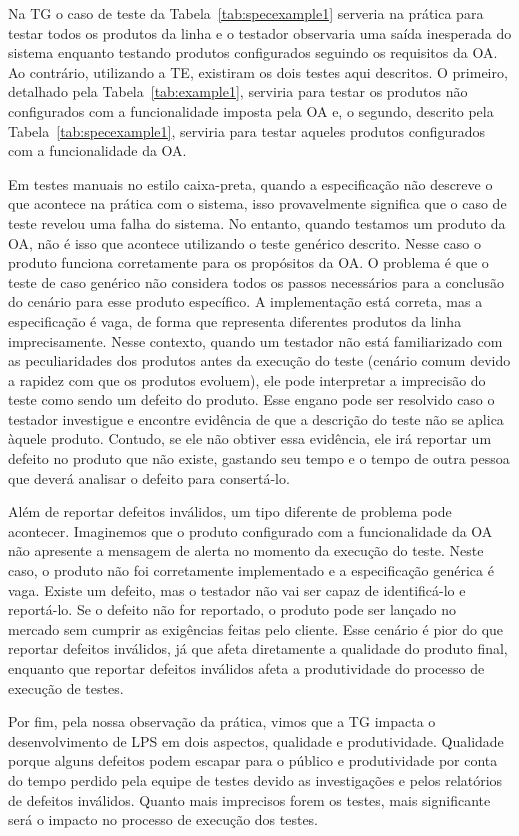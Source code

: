 Na TG o caso de teste da Tabela~\ref{tab:specexample1} serveria na prática para
testar todos os produtos da linha e o testador observaria uma saída inesperada
do sistema enquanto testando produtos configurados seguindo os requisitos da OA.
Ao contrário, utilizando a TE, existiram os dois testes aqui descritos. O
primeiro, detalhado pela Tabela~\ref{tab:example1}, serviria para testar os
produtos não configurados com a funcionalidade imposta pela OA e, o segundo,
descrito pela Tabela~\ref{tab:specexample1}, serviria para testar aqueles
produtos configurados com a funcionalidade da OA.

Em testes manuais no estilo caixa-preta, quando a especificação não descreve o
que acontece na prática com o sistema, isso provavelmente significa que o caso
de teste revelou uma falha do sistema. No entanto, quando testamos um produto da
OA, não é isso que acontece utilizando o teste genérico descrito. Nesse caso o
produto funciona corretamente para os propósitos da OA. O problema é que o teste
de caso genérico não considera todos os passos necessários para a conclusão do
cenário para esse produto específico. A implementação está correta, mas a
especificação é vaga, de forma que representa diferentes
produtos da linha imprecisamente. Nesse contexto, quando um testador não está familiarizado com
as peculiaridades dos produtos antes da execução do teste (cenário comum
devido a rapidez com que os produtos evoluem), ele pode interpretar a imprecisão
do teste como sendo um defeito do produto. Esse engano pode ser resolvido caso o
testador investigue e encontre evidência de que a descrição do teste não se aplica
àquele produto. Contudo, se ele não obtiver essa evidência, ele irá reportar um
defeito no produto que não existe, gastando seu tempo e o tempo de outra pessoa
que deverá analisar o defeito para consertá-lo.

Além de reportar defeitos inválidos, um tipo diferente de problema pode
acontecer. Imaginemos que o produto configurado com a funcionalidade da OA não
apresente a mensagem de alerta no momento da execução do teste. Neste caso, o
produto não foi corretamente implementado e a especificação genérica é vaga.
Existe um defeito, mas o testador não vai ser capaz de identificá-lo e
reportá-lo. Se o defeito não for reportado, o produto pode ser lançado no
mercado sem cumprir as exigências feitas pelo cliente. Esse cenário é pior do
que reportar defeitos inválidos, já que afeta diretamente a qualidade do produto
final, enquanto que reportar defeitos inválidos afeta a produtividade do
processo de execução de testes.

Por fim, pela nossa observação da prática, vimos que a TG impacta o
desenvolvimento de LPS em dois aspectos, qualidade e produtividade. Qualidade
porque alguns defeitos podem escapar para o público e produtividade por conta do
tempo perdido pela equipe de testes devido as investigações e pelos relatórios
de defeitos inválidos. Quanto mais imprecisos forem os testes, mais significante
será o impacto no processo de execução dos testes.
